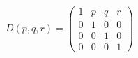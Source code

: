 \begin{equation}
D(p, q, r) = \left( \begin{array}{cccc}
1 & p & q & r \\
0 & 1 & 0 & 0 \\
0 & 0 & 1 & 0 \\
0 & 0 & 0 & 1
\end{array} \right)
\label{53-1}
\end{equation}

